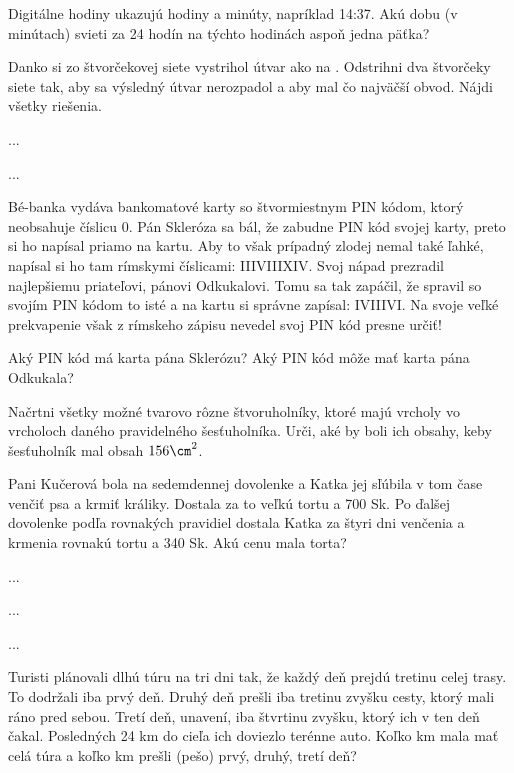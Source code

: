 {%
Digitálne hodiny ukazujú hodiny a minúty, napríklad 14:37. Akú dobu (v minútach)
svieti za 24 hodín na týchto hodinách aspoň jedna päťka?}

{%
Danko si zo štvorčekovej siete vystrihol útvar ako na \obr{}.
Odstrihni dva štvorčeky siete tak, aby sa
výsledný útvar nerozpadol a aby mal čo
najväčší obvod. Nájdi všetky riešenia.
%
}

{%
...}

{%
...}

{%
Bé-banka vydáva bankomatové karty so štvormiestnym PIN kódom, ktorý neobsahuje
číslicu 0. Pán Skleróza sa bál, že zabudne PIN kód svojej karty, preto si ho napísal
priamo na kartu. Aby to však prípadný zlodej nemal také ľahké, napísal si ho tam
rímskymi číslicami: IIIVIIIXIV. Svoj nápad prezradil najlepšiemu priateľovi, pánovi
Odkukalovi. Tomu sa tak zapáčil, že spravil so svojím PIN kódom to isté a na kartu si
správne zapísal: IVIIIVI. Na svoje veľké prekvapenie však z rímskeho zápisu nevedel
svoj PIN kód presne určiť!
\begin{itemize}
 Aký PIN kód má karta pána Sklerózu?
 Aký PIN kód môže mať karta pána Odkukala?
\end{itemize}
}

{%
Načrtni všetky možné tvarovo rôzne štvoruholníky, ktoré majú vrcholy vo vrcholoch
daného pravidelného šesťuholníka. Urči, aké by boli ich obsahy, keby šesťuholník
mal obsah $156\cm^2$.}

{%
Pani Kučerová bola na sedemdennej dovolenke a Katka jej sľúbila v tom čase venčiť
psa a krmiť králiky. Dostala za to veľkú tortu a 700 Sk. Po ďalšej dovolenke podľa
rovnakých pravidiel dostala Katka za štyri dni venčenia a krmenia rovnakú tortu a 340
Sk. Akú cenu mala torta?}

{%
...}

{%
...}

{%
...}

{%
Turisti plánovali dlhú túru na tri dni tak, že každý deň prejdú tretinu celej trasy. To
dodržali iba prvý deň. Druhý deň prešli iba tretinu zvyšku cesty, ktorý mali ráno pred
sebou. Tretí deň, unavení, iba štvrtinu zvyšku, ktorý ich v ten deň čakal. Posledných
24 km do cieľa ich doviezlo terénne auto. Koľko km mala mať celá túra a koľko km
prešli (pešo) prvý, druhý, tretí deň?}

